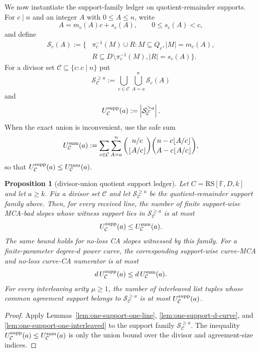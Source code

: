 \documentclass[11pt]{article}
\newtheorem{proposition}[proposition]{Proposition}
\theoremstyle{definition}
\theoremstyle{remark}
\newcommand{\F}{\mathbb{F}}
\newcommand{\RS}{\mathrm{RS}}
\begin{document}
We now instantiate the support-family ledger on quotient-remainder supports.  For
$c\mid n$ and an integer $A$ with $0\le A\le n$, write
\[
        A=m_c(A)c+s_c(A),\qquad 0\le s_c(A)<c,
\]
and define
\[
\begin{aligned}
        \mathcal S_c(A)
        :=\{&\pi_c^{-1}(M)\cup R:
          M\subseteq Q_c,
          |M|=m_c(A),\\
        & R\subseteq D\setminus\pi_c^{-1}(M),
          |R|=s_c(A)\} .
\end{aligned}
\]
For a divisor set $\mathcal C\subseteq\{c:c\mid n\}$ put
\[
        \mathcal S_{\mathcal C}^{\ge a}
        :=\bigcup_{c\in\mathcal C}\bigcup_{A=a}^n \mathcal S_c(A)
\]
and
\[
        U_{\mathcal C}^{\rm supp}(a)
        :=\left|\mathcal S_{\mathcal C}^{\ge a}\right|.
\]
When the exact union is inconvenient, use the safe sum
\[
\label{eq:quotient-support-safe-sum}
        U_{\mathcal C}^{\rm sum}(a)
        :=\sum_{c\in\mathcal C}\sum_{A=a}^n
          \binom{n/c}{\lfloor A/c\rfloor}
          \binom{n-c\lfloor A/c\rfloor}{A-c\lfloor A/c\rfloor},
\]
so that $U_{\mathcal C}^{\rm supp}(a)\le U_{\mathcal C}^{\rm sum}(a)$.

\begin{proposition}[divisor-union quotient support ledger]
\label{prop:divisor-union-support-ledger}
Let $C=\RS[\F,D,k]$ and let $a\ge k$.  Fix a divisor set $\mathcal C$ and let
$\mathcal S_{\mathcal C}^{\ge a}$ be the quotient-remainder support family above.
Then, for every received line, the number of finite support-wise MCA-bad slopes
whose witness support lies in $\mathcal S_{\mathcal C}^{\ge a}$ is at most
\[
        U_{\mathcal C}^{\rm supp}(a)
        \le U_{\mathcal C}^{\rm sum}(a).
\]
The same bound holds for no-loss CA slopes witnessed by this family.  For a
finite-parameter degree-$d$ power curve, the corresponding support-wise curve-MCA
and no-loss curve-CA numerator is at most
\[
        d\,U_{\mathcal C}^{\rm supp}(a)
        \le d\,U_{\mathcal C}^{\rm sum}(a).
\]
For every interleaving arity $\mu\ge1$, the number of interleaved list tuples whose
common agreement support belongs to $\mathcal S_{\mathcal C}^{\ge a}$ is at most
$U_{\mathcal C}^{\rm supp}(a)$.
\end{proposition}

\begin{proof}
Apply Lemmas~\ref{lem:one-support-one-line}, \ref{lem:one-support-d-curve}, and
\ref{lem:one-support-one-interleaved} to the support family
$\mathcal S_{\mathcal C}^{\ge a}$.  The inequality
$U_{\mathcal C}^{\rm supp}(a)\le U_{\mathcal C}^{\rm sum}(a)$ is only the union
bound over the divisor and agreement-size indices.
\end{proof}
\end{document}
